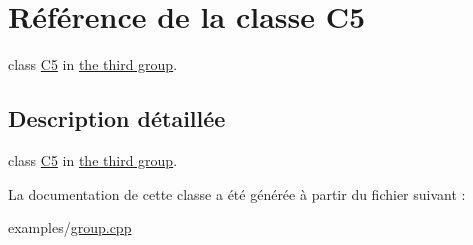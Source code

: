 \hypertarget{class_c5}{}\section{Référence de la classe C5}
\label{class_c5}


class \hyperlink{class_c5}{C5} in \hyperlink{group__group3}{the third group}.  




\subsection{Description détaillée}
class \hyperlink{class_c5}{C5} in \hyperlink{group__group3}{the third group}. 

La documentation de cette classe a été générée à partir du fichier suivant \+:\begin{DoxyCompactItemize}
\item 
examples/\hyperlink{group_8cpp}{group.\+cpp}\end{DoxyCompactItemize}
